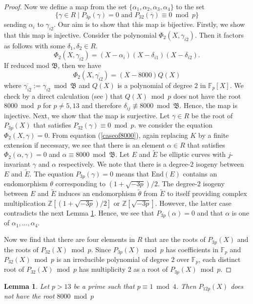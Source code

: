 \documentclass[a4paper, 11pt]{article}
\theoremstyle{plain}
\newtheorem{lem}[defn]{Lemma}
\newcommand{\?}{\textcolor{red}{??}}
\newcommand{\fp}{\mathbb{F}_p}
\newcommand{\bZ}{\mathbb{Z}}
\begin{document}
\begin{proof}
Now we define a map from the set $
\{\alpha_1,\alpha_2,\alpha_3,\alpha_4\}$ to the set 
\[
\{\gamma \in R \mid P_{3p}(\gamma)=0 \textrm{ and } P_{32}(\overline{\gamma})\equiv0 \bmod p\}
\]
sending $\alpha_i$ to $\gamma_{i2}$. 
Our aim is to show that this map is bijective. Firstly, we show that this map is injective. Consider the polynomial $\Phi_2(X,\gamma_{i2})$. Then it factors as follows with some $\delta_1,\delta_2\in R$.
\[
\Phi_2(X,\gamma_{i2})=(X-\alpha_{i})(X-\delta_{i1})(X-\delta_{i2}).
\]
 If reduced mod $\mathfrak{B}$, then we have
 \[
 \Phi_2(X,\overline{\gamma_{i2}})=(X-8000)Q(X)
 \]
 where $\overline{\gamma_{i2}}:=\gamma_{i2} \bmod \mathfrak{B}$ and $Q(X)$ is a polynomial of degree $2$ in $\fp[X]$. We check by a direct calculation (see \cite[15]{Github}) that $Q(X) \bmod p$ does not have the root $8000 \bmod p$ for $p \ne5,13$ and therefore ${\delta_{ij}} \not \equiv 8000 \bmod \mathfrak{B}$. Hence, the map is injective. Next, we show that the map is surjective. Let $\gamma\in R$ be the root of $P_{3p}(X)$ that satisfies $P_{32}(\gamma)\equiv 0 \bmod p$. we consider the equation $\Phi_2(X,\gamma)=0$. From equation (\ref{caseof8000}), again replacing $K$ by a finite extension if necessary, we see that there is an element $\alpha\in R$ that satisfies $\Phi_2(\alpha,\gamma)=0$ and $\alpha\equiv8000 \bmod \mathfrak{B}$. Let $E$ and $\tilde{E}$ be elliptic curves with $j$-invariant $\gamma$ and $\alpha$ respectively. We note that there is a degree-$2$ isogeny between $E$ and $\tilde{E}$.  The equation $P_{3p}(\gamma)=0$ means that $\textrm{End}(E)$ contains an endomorphism $\theta$ corresponding to $(1+\sqrt{-3p})/2$. The degree-$2$ isogeny between $E$ and $\tilde{E}$ induces an endomorphism $\tilde{\theta}$ from $\tilde{E}$ to itself providing complex multiplication $\bZ[(1+\sqrt{-3p})/2]$ or  $\bZ[\sqrt{-3p}]$. However, the latter case contradicts the next Lemma \ref{p12and8000}. Hence, we see that $P_{3p}(\alpha)=0$ and that $\alpha$ is one of $\alpha_1,\ldots,\alpha_4$. 

 Now we find that there are four elements in $R$ that are the roots of $P_{3p}(X)$ and the roots of $P_{32}(X) \bmod p$. Since $P_{3p}(X) \bmod p$ has coefficients in $\fp$ and $P_{32}(X)\bmod p$ is an irreducible polynomial of degree $2$ over $\fp$, each distinct root of $P_{32}(X)\bmod p$ has multiplicity $2$ as a root of $P_{3p}(X) \bmod p$.
\end{proof}
\begin{lem}
\label{p12and8000}
    Let $p>13$ be a prime such that $p\equiv 1\bmod 4$. Then $P_{12p}(X)$ does not have the root $8000 \bmod p$
\end{lem}
\end{document}
